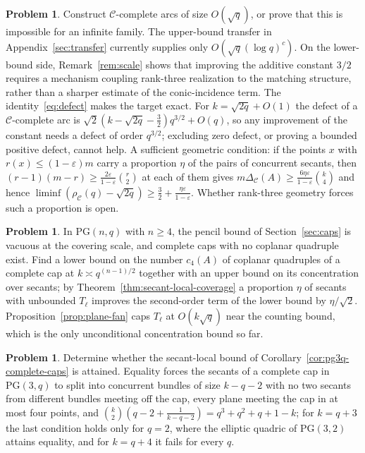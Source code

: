 \documentclass[11pt]{article}
\theoremstyle{definition}
\newtheorem{problem}[theorem]{Problem}
\theoremstyle{remark}
\newcommand{\PG}{\mathrm{PG}}
\newcommand{\cC}{\mathcal{C}}
\newcommand{\rhoC}{\rho_{\cC}}
\begin{document}
\begin{problem}
Construct $\cC$-complete arcs of size $O(\sqrt q)$, or prove that this is
impossible for an infinite family.  The upper-bound transfer in
Appendix~\ref{sec:transfer} currently supplies only
$O(\sqrt q(\log q)^c)$.  On the lower-bound side,
Remark~\ref{rem:scale} shows that improving the additive constant \(3/2\)
requires a mechanism coupling rank-three realization to the matching
structure, rather than a sharper estimate of the conic-incidence term.
The identity~\eqref{eq:defect} makes the target exact.  For
$k=\sqrt{2q}+O(1)$ the defect of a $\cC$-complete arc is
$\sqrt2(k-\sqrt{2q}-\tfrac32)q^{3/2}+O(q)$, so any improvement of the
constant needs a defect of order $q^{3/2}$; excluding zero defect, or
proving a bounded positive defect, cannot help.  A sufficient geometric
condition: if the points $x$ with $r(x)\le(1-\varepsilon)m$ carry a
proportion $\eta$ of the pairs of concurrent secants, then
$(r-1)(m-r)\ge\frac{2\varepsilon}{1-\varepsilon}\binom r2$ at each of them
gives $m\Delta_{\cC}(A)\ge\frac{6\eta\varepsilon}{1-\varepsilon}\binom{k}{4}$
and hence
$\liminf(\rhoC(q)-\sqrt{2q})\ge\frac32+\frac{\eta\varepsilon}{1-\varepsilon}$.
Whether rank-three geometry forces such a proportion is open.
\end{problem}

\begin{problem}
In $\PG(n,q)$ with $n\ge4$, the pencil bound of
Section~\ref{sec:caps} is vacuous at the covering scale, and complete caps
with no coplanar quadruple exist.  Find a lower bound on the number
$c_4(A)$ of coplanar quadruples of a complete cap at
$k\asymp q^{(n-1)/2}$ together with an upper bound on its concentration over
secants; by Theorem~\ref{thm:secant-local-coverage} a proportion $\eta$ of
secants with unbounded $T_\ell$ improves the second-order term of the
lower bound by $\eta/\sqrt2$.  Proposition~\ref{prop:plane-fan} caps
$T_\ell$ at $O(k\sqrt q)$ near the counting bound, which is the only
unconditional concentration bound so far.
\end{problem}

\begin{problem}
Determine whether the secant-local bound of
Corollary~\ref{cor:pg3q-complete-caps} is attained.  Equality forces the
secants of a complete cap in $\PG(3,q)$ to split into concurrent bundles of
size $k-q-2$ with no two secants from different bundles meeting off the
cap, every plane meeting
the cap in at most four points, and $\binom{k}{2}(q-2+\frac1{k-q-2})=q^3+q^2+q+1-k$;
for $k=q+3$ the last condition holds only for $q=2$, where the elliptic
quadric of $\PG(3,2)$ attains equality, and for $k=q+4$ it fails for every
$q$.
\end{problem}
\end{document}
